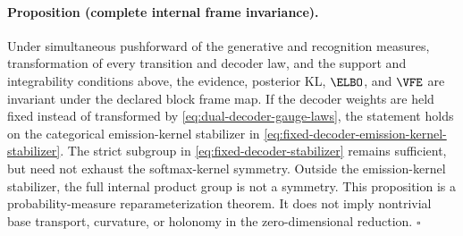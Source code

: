 \paragraph{Proposition (complete internal frame invariance).}
Under simultaneous pushforward of the generative and recognition measures, transformation of every transition and decoder law, and the support and integrability conditions above, the evidence, posterior KL, $\ELBO$, and $\VFE$ are invariant under the declared block frame map. If the decoder weights are held fixed instead of transformed by \cref{eq:dual-decoder-gauge-laws}, the statement holds on the categorical emission-kernel stabilizer in \cref{eq:fixed-decoder-emission-kernel-stabilizer}. The strict subgroup in \cref{eq:fixed-decoder-stabilizer} remains sufficient, but need not exhaust the softmax-kernel symmetry. Outside the emission-kernel stabilizer, the full internal product group is not a symmetry. This proposition is a probability-measure reparameterization theorem. It does not imply nontrivial base transport, curvature, or holonomy in the zero-dimensional reduction. \hfill$\square$
